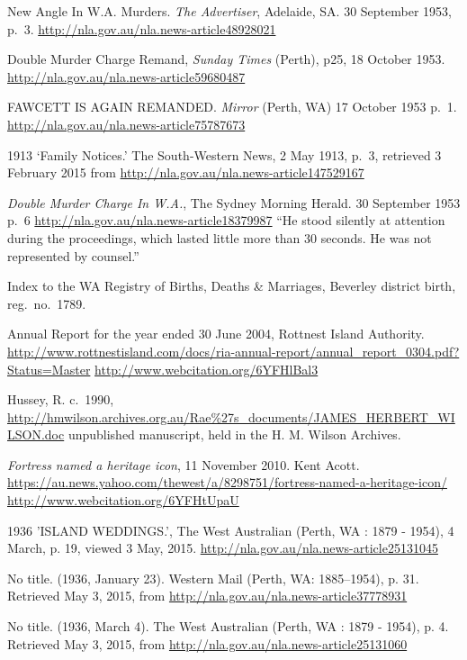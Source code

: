 \begin{thebibliography}{999}
	New Angle In W.A. Murders. \emph{The Advertiser}, Adelaide, SA. 30 September 1953, p.\ 3.
	\url{http://nla.gov.au/nla.news-article48928021}

	Double Murder Charge Remand, \emph{Sunday Times} (Perth), p25, 18 October 1953.
	\url{http://nla.gov.au/nla.news-article59680487}

	FAWCETT IS AGAIN REMANDED. \emph{Mirror} (Perth, WA) 17 October 1953 p.\ 1.
	\url{http://nla.gov.au/nla.news-article75787673}

	1913 `Family Notices.' The South-Western News, 2 May 1913, p.~3,
	retrieved 3 February 2015 from \url{http://nla.gov.au/nla.news-article147529167}

	\emph{Double Murder Charge In W.A.}, The Sydney Morning Herald. 30 September 1953 p.~6
	\url{http://nla.gov.au/nla.news-article18379987}
	``He stood silently at attention during the proceedings, which lasted little more than 30 seconds.
	He was not represented by counsel.''

	Index to the WA Registry of Births, Deaths \& Marriages, Beverley district birth, reg.~no.~1789.

	Annual Report for the year ended 30 June 2004, Rottnest Island Authority.
	\url{http://www.rottnestisland.com/docs/ria-annual-report/annual_report_0304.pdf?Status=Master}
	\url{http://www.webcitation.org/6YFHlBal3}

	Hussey, R. c.~1990, \url{http://hmwilson.archives.org.au/Rae\%27s_documents/JAMES_HERBERT_WILSON.doc}
	unpublished manuscript, held in the  H. M. Wilson Archives.

	\emph{Fortress named a heritage icon}, 11 November 2010. Kent Acott.
	\url{https://au.news.yahoo.com/thewest/a/8298751/fortress-named-a-heritage-icon/}
	\url{http://www.webcitation.org/6YFHtUpaU}

    1936 'ISLAND WEDDINGS.', The West Australian (Perth, WA : 1879 - 1954), 4 March, p. 19, viewed 3 May, 2015.
    \url{http://nla.gov.au/nla.news-article25131045}

	No title. (1936, January 23). Western Mail (Perth, WA: 1885--1954), p. 31. Retrieved May 3, 2015,
	from \url{http://nla.gov.au/nla.news-article37778931}

	No title. (1936, March 4). The West Australian (Perth, WA : 1879 - 1954), p. 4.
	Retrieved May 3, 2015, from \url{http://nla.gov.au/nla.news-article25131060}


\end{thebibliography}

